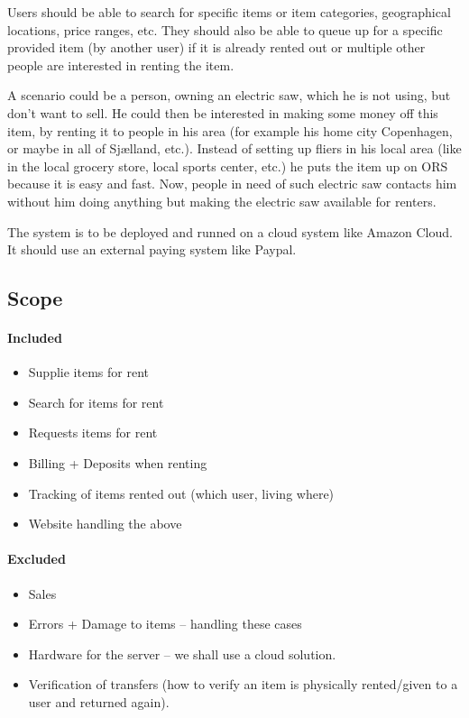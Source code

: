 \documentclass[a4paper,11pt]{report}
\begin{document}
Users should be able to search for specific items or item categories,
geographical locations, price ranges, etc. They should also be able to queue up
for a specific provided item (by another user) if it is already rented out or
multiple other people are interested in renting the item.

A scenario could be a person, owning an electric saw, which he is not using, but
don't want to sell. He could then be interested in making some money off this
item, by renting it to people in his area (for example his home city Copenhagen,
or maybe in all of Sjælland, etc.). Instead of setting up fliers in his local
area (like in the local grocery store, local sports center, etc.) he puts the
item up on ORS because it is easy and fast. Now, people in need of such electric
saw contacts him without him doing anything but making the electric saw
available for renters.

The system is to be deployed and runned on a cloud system like Amazon Cloud. It should use an external paying system like Paypal.

\subsection{Scope}
\paragraph{Included}
\begin{itemize}
\item Supplie items for rent
\item Search for items for rent
\item Requests items for rent
\item Billing + Deposits when renting
\item Tracking of items rented out (which user, living where)
\item Website handling the above
\end{itemize}

\paragraph{Excluded}
\begin{itemize}
\item Sales
\item Errors + Damage to items -- handling these cases
\item Hardware for the server -- we shall use a cloud solution.
\item Verification of transfers (how to verify an item is physically rented/given to a user and returned again).
\end{itemize}
\end{document}
